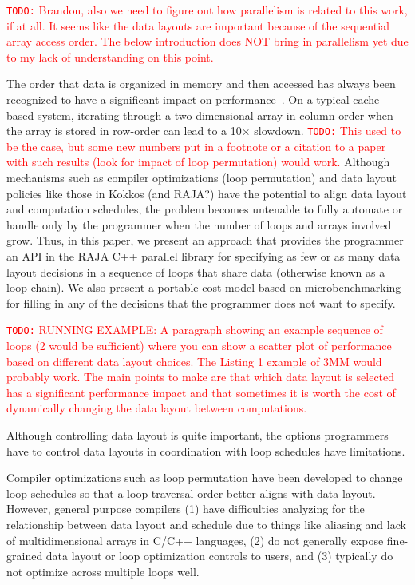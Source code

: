 \documentclass[sigconf, table]{acmart}
\newcommand{\todo}[1]{{\textcolor{red}{{\tt{TODO:}}\,\,#1 }}}
\begin{document}
\todo{Brandon, also we need to figure out how parallelism is related to this work, if at all.  It seems like the
data layouts are important because of the sequential array access order.  The below introduction does NOT
bring in parallelism yet due to my lack of understanding on this point.}

The order that data is organized in memory and then accessed has always been recognized to have a
significant impact on performance~\cite{needrefs}.  
On a typical cache-based system, iterating through a two-dimensional
array in column-order when the array is stored in row-order can lead to a 10$\times$ slowdown.
\todo{This used to be the case, but some new numbers put in a footnote or a citation to a paper with such
results (look for impact of loop permutation) would work.}
Although mechanisms such as compiler optimizations (loop permutation) and data layout policies like
those in Kokkos (and RAJA?) have the potential to align data layout and computation schedules, the
problem becomes untenable to fully automate or handle only by the programmer when the number
of loops and arrays involved grow.
Thus, in this paper, we present an approach that provides the programmer an API in the RAJA C++
parallel library for specifying as few
or as many data layout decisions in a sequence of loops that share data (otherwise known as a loop chain).
We also present a portable cost model based on microbenchmarking 
for filling in any of the decisions that the programmer does not want to specify.

\todo{RUNNING EXAMPLE: A paragraph showing an example sequence of loops 
(2 would be sufficient) 
where you can show a scatter plot of performance based on different data layout choices.  
The Listing 1 example of 3MM would probably work.
The main points to make
are that which data layout is selected has a significant performance impact and that sometimes
it is worth the cost of dynamically changing the data layout between computations.}

Although controlling data layout is quite important, the options programmers have to control
data layouts in coordination with loop schedules have limitations.

Compiler optimizations such as loop permutation have been developed to change loop
schedules so that a loop traversal order better aligns with data layout.
However, general purpose compilers (1) have difficulties analyzing for the relationship between
data layout and schedule due to things like aliasing and lack of multidimensional arrays in 
C/C++ languages, (2) do not generally expose fine-grained data layout or loop optimization
controls to users, and (3) typically do not optimize across multiple loops well.
\end{document}
